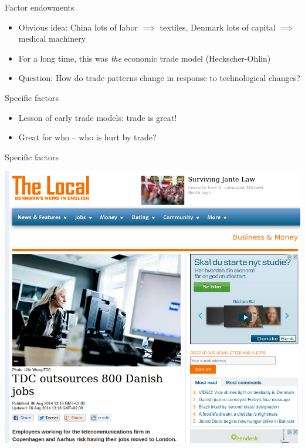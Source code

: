 \documentclass[ignorenonframetext,]{beamer}
\begin{document}
\begin{frame}{Factor endowments}

    \begin{itemize}
        \item Obvious idea: China lots of labor $\implies$ textiles, Denmark lots of capital $\implies$ medical machinery
        \item For a long time, this was \emph{the} economic trade model (Heckscher-Ohlin)
        \item Question: How do trade patterns  change in response to technological changes?
    \end{itemize}

\end{frame}

\begin{frame}{Specific factors}

    \begin{itemize}
        \item Lesson of early trade models: trade is great! 
        \item Great for who -- who is hurt by trade?
    \end{itemize}

\end{frame}

\begin{frame}{Specific factors}

    \includegraphics[scale=0.3]{jobs_to_london.png}

\end{frame}
\end{document}
